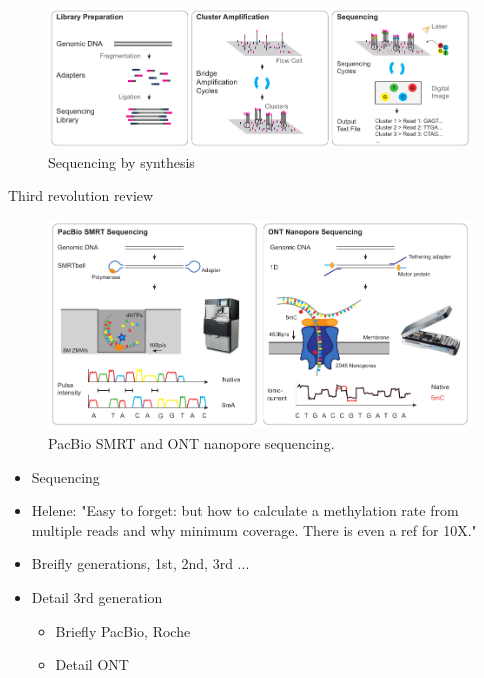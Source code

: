 \begin{figure}[h]
	\centering
	\includegraphics[width=1.0\textwidth]{figures/intro/sbs.pdf}
	\captionsetup{format=plain}
	\caption[Sequencing by synthesis]{Sequencing by synthesis}
	\label{fig:intro:sbs}
\end{figure}

Third revolution review \cite{Dijk2018}

\begin{figure}[h]
	\centering
	\includegraphics[width=1.0\textwidth]{figures/intro/long_read.pdf}
	\captionsetup{format=plain}
	\caption[Long read sequencing]{PacBio SMRT and ONT nanopore sequencing.}
	\label{fig:intro:longread}
\end{figure}

\begin{itemize}
    \item Sequencing
    \item Helene: "Easy to forget: but how to calculate a methylation rate from multiple reads and why minimum coverage. There is even a ref for 10X."
    \item Breifly generations, 1st, 2nd, 3rd ...
    \item Detail 3rd generation
    \begin{itemize}
        \item Briefly PacBio, Roche
        \item Detail ONT
    \end{itemize}
\end{itemize}

